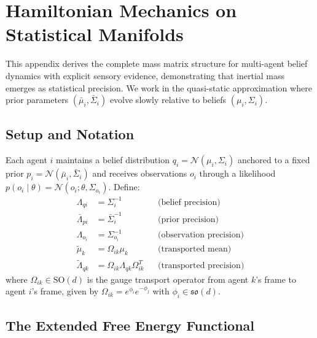 \documentclass[12pt]{article}
\begin{document}

\section{Hamiltonian Mechanics on Statistical Manifolds}
\label{app:hamiltonian}

This appendix derives the complete mass matrix structure for multi-agent belief dynamics with explicit sensory evidence, demonstrating that inertial mass emerges as statistical precision. We work in the quasi-static approximation where prior parameters $(\bar{\mu}_i, \bar{\Sigma}_i)$ evolve slowly relative to beliefs $(\mu_i, \Sigma_i)$.

\subsection{Setup and Notation}

Each agent $i$ maintains a belief distribution $q_i = \mathcal{N}(\mu_i, \Sigma_i)$ anchored to a fixed prior $p_i = \mathcal{N}(\bar{\mu}_i, \bar{\Sigma}_i)$ and receives observations $o_i$ through a likelihood $p(o_i \mid \theta) = \mathcal{N}(o_i; \theta, \Sigma_{o_i})$. Define:
%
\begin{align}
\Lambda_{qi} &= \Sigma_i^{-1} & &\text{(belief precision)} \\
\bar{\Lambda}_{pi} &= \bar{\Sigma}_i^{-1} & &\text{(prior precision)} \\
\Lambda_{o_i} &= \Sigma_{o_i}^{-1} & &\text{(observation precision)} \\
\tilde{\mu}_k &= \Omega_{ik}\mu_k & &\text{(transported mean)} \\
\tilde{\Lambda}_{qk} &= \Omega_{ik}\Lambda_{qk}\Omega_{ik}^T & &\text{(transported precision)}
\end{align}
%
where $\Omega_{ik} \in \mathrm{SO}(d)$ is the gauge transport operator from agent $k$'s frame to agent $i$'s frame, given by $\Omega_{ik} = e^{\phi_i}e^{-\phi_j}$ with $\phi_i \in \mathfrak{so}(d)$.

\subsection{The Extended Free Energy Functional}
\end{document}
